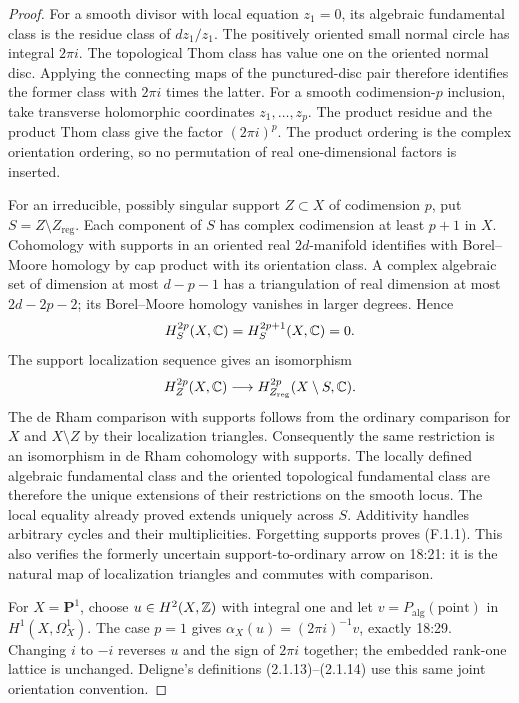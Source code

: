 \begin{proof}
For a smooth divisor with local equation $z_1=0$, its algebraic fundamental class is the residue class of $dz_1/z_1$. The positively oriented small normal circle has integral $2\pi i$. The topological Thom class has value one on the oriented normal disc. Applying the connecting maps of the punctured-disc pair therefore identifies the former class with $2\pi i$ times the latter. For a smooth codimension-$p$ inclusion, take transverse holomorphic coordinates $z_1,\ldots,z_p$. The product residue and the product Thom class give the factor $(2\pi i)^p$. The product ordering is the complex orientation ordering, so no permutation of real one-dimensional factors is inserted.

For an irreducible, possibly singular support $Z\subset X$ of codimension $p$, put $S=Z\setminus Z_{\mathrm{reg}}$. Each component of $S$ has complex codimension at least $p+1$ in $X$. Cohomology with supports in an oriented real $2d$-manifold identifies with Borel--Moore homology by cap product with its orientation class. A complex algebraic set of dimension at most $d-p-1$ has a triangulation of real dimension at most $2d-2p-2$; its Borel--Moore homology vanishes in larger degrees. Hence
\[
 H_S^{2p}(X,\mathbb C)=H_S^{2p+1}(X,\mathbb C)=0.
\]
The support localization sequence gives an isomorphism
\[
 H_Z^{2p}(X,\mathbb C)\longrightarrow
 H_{Z_{\mathrm{reg}}}^{2p}(X\setminus S,\mathbb C).
\]
The de Rham comparison with supports follows from the ordinary comparison for $X$ and $X\setminus Z$ by their localization triangles. Consequently the same restriction is an isomorphism in de Rham cohomology with supports. The locally defined algebraic fundamental class and the oriented topological fundamental class are therefore the unique extensions of their restrictions on the smooth locus. The local equality already proved extends uniquely across $S$. Additivity handles arbitrary cycles and their multiplicities. Forgetting supports proves (F.1.1). This also verifies the formerly uncertain support-to-ordinary arrow on 18:21: it is the natural map of localization triangles and commutes with comparison.

For $X=\mathbf P^1$, choose $u\in H^2(X,\mathbb Z)$ with integral one and let $v=P_{\mathrm{alg}}(\mathrm{point})$ in $H^1(X,\Omega_X^1)$. The case $p=1$ gives $\alpha_X(u)=(2\pi i)^{-1}v$, exactly 18:29. Changing $i$ to $-i$ reverses $u$ and the sign of $2\pi i$ together; the embedded rank-one lattice is unchanged. Deligne's definitions (2.1.13)--(2.1.14) \cite{Deligne1971HodgeII} use this same joint orientation convention.
\end{proof}

